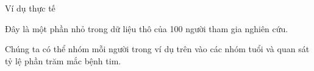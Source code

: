 \documentclass[notheorems,hyperref={bookmarks=true}]{beamer}
\theoremstyle{plain}
\begin{document}
\begin{footnotesize}
\begin{frame}{Ví dụ thực tế}
\begin{figure}
\end{figure}
Đây là một phần nhỏ trong dữ liệu thô của 100 người tham gia nghiên cứu.     
\end{frame}

\begin{frame}
    Chúng ta có thể nhóm mỗi người trong ví dụ trên vào các nhóm tuổi và quan sát tỷ lệ phần trăm mắc bệnh tim.
    \begin{figure}
    \end{figure}
\end{frame}

\end{footnotesize}
\end{document}
